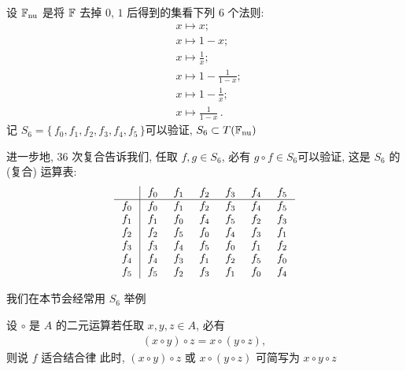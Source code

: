 \begin{example}
    设 $\mathbb{F}_{\mathrm{nu}}$ 是将 $\mathbb{F}$ 去掉 $0$, $1$ 后得到的集\period 看下列 $6$ 个法则:
    \begin{align*}
         & x \mapsto x; \tag*{$f_0 \colon$}                   \\
         & x \mapsto 1-x; \tag*{$f_1 \colon$}                 \\
         & x \mapsto \frac{1}{x}; \tag*{$f_2 \colon$}         \\
         & x \mapsto 1-\frac{1}{1-x}; \tag*{$f_3 \colon$}     \\
         & x \mapsto 1-\frac{1}{x}; \tag*{$f_4 \colon$}       \\
         & x \mapsto \frac{1}{1-x}\period \tag*{$f_5 \colon$}
    \end{align*}
    记 $S_6 = \{\, f_0,f_1,f_2,f_3,f_4,f_5 \,\}$\period 可以验证, $S_6 \subset T(\mathbb{F}_{\mathrm{nu}})$\period

    进一步地, $36$ 次复合告诉我们, 任取 $f,g \in S_6$, 必有 $g \circ f \in S_6$\period 可以验证, 这是 $S_6$ 的 (复合) 运算表:
    \begin{align*}
        \arraycolsep=0.25cm
        \begin{array}{c|cccccc}
            \     & f_{0} & f_{1} & f_{2} & f_{3} & f_{4} & f_{5} \\ \hline
            f_{0} & f_{0} & f_{1} & f_{2} & f_{3} & f_{4} & f_{5} \\
            f_{1} & f_{1} & f_{0} & f_{4} & f_{5} & f_{2} & f_{3} \\
            f_{2} & f_{2} & f_{5} & f_{0} & f_{4} & f_{3} & f_{1} \\
            f_{3} & f_{3} & f_{4} & f_{5} & f_{0} & f_{1} & f_{2} \\
            f_{4} & f_{4} & f_{3} & f_{1} & f_{2} & f_{5} & f_{0} \\
            f_{5} & f_{5} & f_{2} & f_{3} & f_{1} & f_{0} & f_{4} \\
        \end{array}
    \end{align*}

    我们在本节会经常用 $S_6$ 举例\period
\end{example}

\begin{definition}
    设 $\circ$ 是 $A$ 的二元运算\period 若任取 $x,y,z \in A$, 必有
    \begin{align*}
        (x \circ y) \circ z = x \circ (y \circ z),
    \end{align*}
    则说 $f$ 适合结合律 \period 此时, $(x \circ y) \circ z$ 或 $x \circ (y \circ z)$ 可简写为 $x \circ y \circ z$\period
\end{definition}

